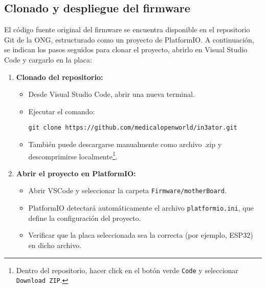 \subsection{Clonado y despliegue del firmware}

El código fuente original del firmware se encuentra disponible en el repositorio Git de la ONG, estructurado como un proyecto de PlatformIO. A continuación, se indican los pasos seguidos para clonar el proyecto, abrirlo en Visual Studio Code y cargarlo en la placa:

\begin{enumerate}
  \item \textbf{Clonado del repositorio:}
  \begin{itemize}
    \item Desde Visual Studio Code, abrir una nueva terminal.
    \item Ejecutar el comando:
    \begin{verbatim}
git clone https://github.com/medicalopenworld/in3ator.git
    \end{verbatim}
    \item También puede descargarse manualmente como archivo .zip y descomprimirse localmente\footnote{Dentro del repositorio, hacer click en el botón verde \texttt{Code} y seleccionar \texttt{Download ZIP}.}.
  \end{itemize}

  \item \textbf{Abrir el proyecto en PlatformIO:}
  \begin{itemize}
    \item Abrir VSCode y seleccionar la carpeta \texttt{Firmware/motherBoard}.
    \item PlatformIO detectará automáticamente el archivo \texttt{platformio.ini}, que define la configuración del proyecto.
    \item Verificar que la placa seleccionada sea la correcta (por ejemplo, ESP32) en dicho archivo.
  \end{itemize}


\end{enumerate}

